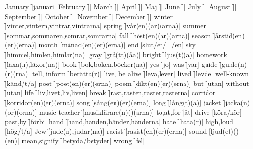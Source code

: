 \begin{questions}
    \begin{multicols}{2}
        \raggedcolumns
        \question January \f[januari]
        \question February \f[]
        \question March \f[]
        \question April \f[]
        \question Maj \f[]
        \question June \f[]
        \question July \f[]
        \question August \f[]
        \question September \f[]
        \question October \f[]
        \question November \f[]
        \question December \f[]
        \question winter \f[vinter,vintern,vintrar,vintrarna]
        \question spring \f[vår(en)(ar)(arna)]
        \question summer \f[sommar,sommaren,somrar,somrarna]
        \question fall \f[höst(en)(ar)(arna)]
        \question season \f[årstid(en)(er)(erna)]
        \question month \f[månad(en)(er)(erna)]
        \question end \f[slut/et/\_/en]
        \question sky \f[himmel,himlen,himlar(na)]
        \question gray \f[grå(tt)(åa)]
        \question bright \f[ljus(t)(a)]
        \question homework \f[läxa(n),läxor(na)]
        \question book \f[bok,boken,böcker(na)]
        \question yes \f[jo]
        \question was \f[var]
        \question guide \f[guide(n)(r)(rna)]
        \question tell, inform \f[berätta(r)]
        \question live, be alive \f[leva,lever]
        \question lived \f[levde]
        \question well-known \f[känd/t/a]
        \question poet \f[poet(en)(er)(erna)]
        \question poem \f[dikt(en)(er)(erna)]
        \question but \f[utan]
        \question without \f[utan]
        \question life \f[liv,livet,liv,liven]
        \question break \f[rast,rasten,raster,rasterna]
        \question corridor \f[korridor(en)(er)(erna)]
        \question song \f[sång(en)(er)(erna)]
        \question long \f[lång(t)(a)]
        \question jacket \f[jacka(n)(or)(orna)]
        \question music teacher \f[musiklärare(n)()(arna)]
        \question to,at,for \f[åt]
        \question drive \f[köra/kör]
        \question past,by \f[förbi]
        \question hand \f[hand,handen,händer,händerna]
        \question hate \f[hata(r)]
        \question high,loud \f[hög/t/a]
        \question Jew \f[jude(n),judar(na)]
        \question racist \f[rasist(en)(er)(erna)]
        \question sound \f[ljud(et)()(en)]
        \question mean,signify \f[betyda/betyder]
        \question wrong \f[fel]
    \end{multicols}
\end{questions}
